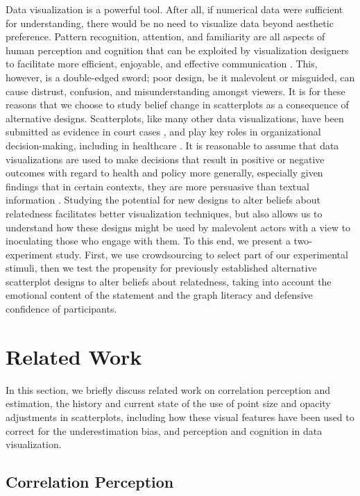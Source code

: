 \documentclass[manuscript,screen,review,anonymous]{acmart}
\begin{document}
Data visualization is a powerful tool. After all, if numerical data were
sufficient for understanding, there would be no need to visualize data
beyond aesthetic preference. Pattern recognition, attention, and
familiarity are all aspects of human perception and cognition that can
be exploited by visualization designers to facilitate more efficient,
enjoyable, and effective communication \citep{franconeri_2021}. This,
however, is a double-edged sword; poor design, be it malevolent or
misguided, can cause distrust, confusion, and misunderstanding amongst
viewers. It is for these reasons that we choose to study belief change
in scatterplots as a consequence of alternative designs. Scatterplots,
like many other data visualizations, have been submitted as evidence in
court cases \citep{bobko_1979}, and play key roles in organizational
decision-making, including in healthcare \citep{poly_2019}. It is
reasonable to assume that data visualizations are used to make decisions
that result in positive or negative outcomes with regard to health and
policy more generally, especially given findings that in certain
contexts, they are more persuasive than textual information
\citep{pandey_2014}. Studying the potential for new designs to alter
beliefs about relatedness facilitates better visualization techniques,
but also allows us to understand how these designs might be used by
malevolent actors with a view to inoculating those who engage with them.
To this end, we present a two-experiment study. First, we use
crowdsourcing to select part of our experimental stimuli, then we test
the propensity for previously established alternative scatterplot
designs to alter beliefs about relatedness, taking into account the
emotional content of the statement and the graph literacy and defensive
confidence of participants.

\section{Related Work}\label{sec-rel-work-main}

In this section, we briefly discuss related work on correlation
perception and estimation, the history and current state of the use of
point size and opacity adjustments in scatterplots, including how these
visual features have been used to correct for the underestimation bias,
and perception and cognition in data visualization.

\subsection{Correlation Perception}\label{sec-corr-percept}
\end{document}
